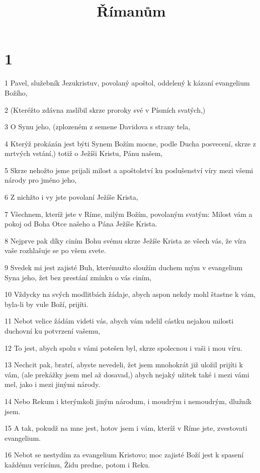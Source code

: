 

\title{Římanům}

\chapter{1}

\par 1 Pavel, služebník Jezukristuv, povolaný apoštol, oddelený k kázaní evangelium Božího,
\par 2 (Kteréžto zdávna zaslíbil skrze proroky své v Písmích svatých,)
\par 3 O Synu jeho, (zplozeném z semene Davidova s strany tela,
\par 4 Kterýž prokázán jest býti Synem Božím mocne, podle Ducha posvecení, skrze z mrtvých vstání,) totiž o Ježíši Kristu, Pánu našem,
\par 5 Skrze nehožto jsme prijali milost a apoštolství ku poslušenství víry mezi všemi národy pro jméno jeho,
\par 6 Z nichžto i vy jste povolaní Ježíše Krista,
\par 7 Všechnem, kteríž jste v Ríme, milým Božím, povolaným svatým: Milost vám a pokoj od Boha Otce našeho a Pána Ježíše Krista.
\par 8 Nejprve pak díky ciním Bohu svému skrze Ježíše Krista ze všech vás, že víra vaše rozhlašuje se po všem svete.
\par 9 Svedek mi jest zajisté Buh, kterémužto sloužím duchem mým v evangelium Syna jeho, žet bez prestání zmínku o vás ciním,
\par 10 Vždycky na svých modlitbách žádaje, abych aspon nekdy mohl štastne k vám, byla-li by vule Boží, prijíti.
\par 11 Nebot velice žádám videti vás, abych vám udelil cástku nejakou milosti duchovní ku potvrzení vašemu,
\par 12 To jest, abych spolu s vámi potešen byl, skrze spolecnou i vaši i mou víru.
\par 13 Nechcit pak, bratrí, abyste nevedeli, žet jsem mnohokrát již uložil prijíti k vám, (ale prekážky jsem mel až dosavad,) abych nejaký užitek také i mezi vámi mel, jako i mezi jinými národy.
\par 14 Nebo Rekum i kterýmkoli jiným národum, i moudrým i nemoudrým, dlužník jsem.
\par 15 A tak, pokudž na mne jest, hotov jsem i vám, kteríž v Ríme jste, zvestovati evangelium.
\par 16 Nebot se nestydím za evangelium Kristovo; moc zajisté Boží jest k spasení každému verícímu, Židu predne, potom i Reku.
